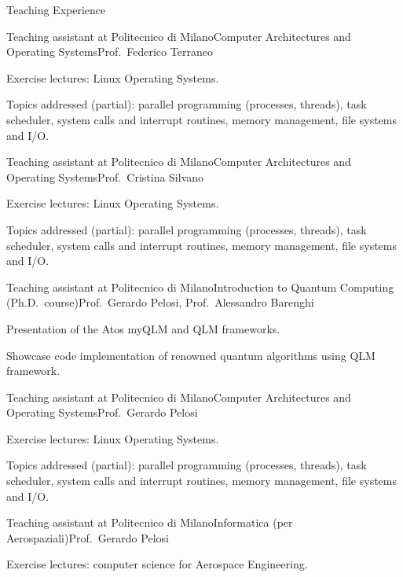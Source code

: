 \documentclass[
	a4paper, %
	10pt, %
]{tresume} %
\begin{document}
\begin{tSection}{Teaching Experience}
  \begin{tSubsection}{Teaching assistant at Politecnico di Milano}{}{Computer Architectures and
      Operating Systems}{Prof.\ Federico Terraneo}
  \item Exercise lectures: Linux Operating Systems.
  \item Topics addressed (partial): parallel programming (processes, threads),
    task scheduler, system calls and interrupt routines, memory management, file
    systems and I/O.
  \end{tSubsection}
  \begin{tSubsection}{Teaching assistant at Politecnico di Milano}{}{Computer Architectures and
      Operating Systems}{Prof.\ Cristina Silvano }
  \item Exercise lectures: Linux Operating Systems.
  \item Topics addressed (partial): parallel programming (processes, threads),
    task scheduler, system calls and interrupt routines, memory management, file
    systems and I/O.
  \end{tSubsection}
  \begin{tSubsection}{Teaching assistant at Politecnico di Milano}{}{Introduction
    to Quantum Computing (Ph.D.\ course)}{Prof.\ Gerardo Pelosi, Prof.\ Alessandro Barenghi}
  \item Presentation of the Atos myQLM and QLM frameworks.
  \item Showcase code implementation of renowned quantum algorithms using QLM
    framework.
  \end{tSubsection}
  \begin{tSubsection}{Teaching assistant at Politecnico di Milano}{}{Computer Architectures and Operating Systems}{Prof.\ Gerardo Pelosi}
  \item Exercise lectures: Linux Operating Systems.
  \item Topics addressed (partial): parallel programming (processes, threads),
    task scheduler, system calls and interrupt routines, memory management, file
    systems and I/O.
  \end{tSubsection}
  \begin{tSubsection}{Teaching assistant at Politecnico di Milano}{}{Informatica (per Aerospaziali)}{Prof.\ Gerardo Pelosi}
  \item Exercise lectures: computer science for Aerospace Engineering.

\end{tSubsection}
\end{tSection}
\end{document}
